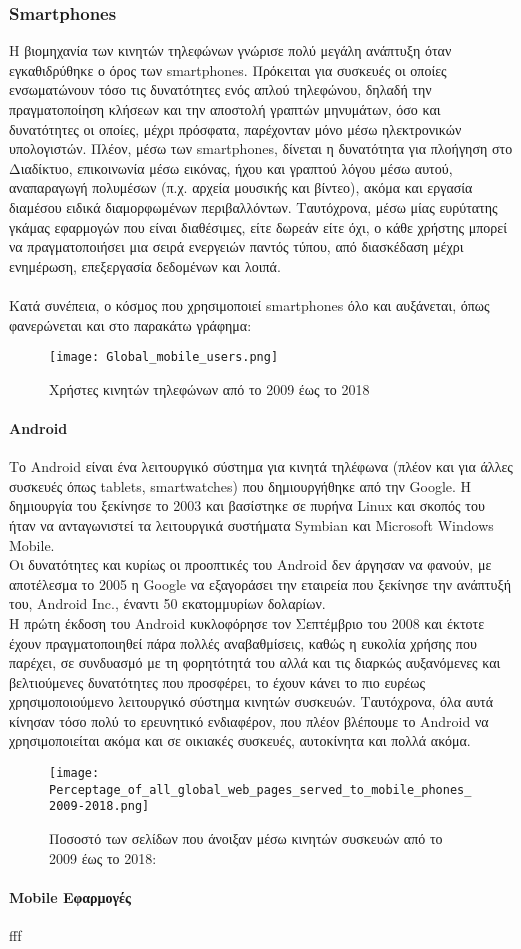 \documentclass{article}
\begin{document}
\subsubsection{Smartphones}
Η βιομηχανία των κινητών τηλεφώνων γνώρισε πολύ μεγάλη ανάπτυξη όταν εγκαθιδρύθηκε ο όρος των smartphones. Πρόκειται για συσκευές οι οποίες ενσωματώνουν τόσο τις δυνατότητες ενός απλού τηλεφώνου, δηλαδή την πραγματοποίηση κλήσεων και την αποστολή γραπτών μηνυμάτων, όσο και δυνατότητες οι οποίες, μέχρι πρόσφατα, παρέχονταν μόνο μέσω ηλεκτρονικών υπολογιστών. Πλέον, μέσω των smartphones, δίνεται η δυνατότητα για πλοήγηση στο Διαδίκτυο, επικοινωνία μέσω εικόνας, ήχου και γραπτού λόγου μέσω αυτού, αναπαραγωγή πολυμέσων (π.χ. αρχεία μουσικής και βίντεο), ακόμα και εργασία διαμέσου ειδικά διαμορφωμένων περιβαλλόντων. Ταυτόχρονα, μέσω μίας ευρύτατης γκάμας εφαρμογών που είναι διαθέσιμες, είτε δωρεάν είτε όχι, ο κάθε χρήστης μπορεί να πραγματοποιήσει μια σειρά ενεργειών παντός τύπου, από διασκέδαση μέχρι ενημέρωση, επεξεργασία δεδομένων και λοιπά.\\~\\
Κατά συνέπεια, ο κόσμος που χρησιμοποιεί smartphones όλο και αυξάνεται, όπως φανερώνεται και στο παρακάτω γράφημα:
\begin{figure}[h]
  \caption{Χρήστες κινητών τηλεφώνων από το 2009 έως το 2018}
  \centering
  \texttt{[image: Global\_mobile\_users.png]}
\end{figure}

\paragraph{Android}
Το Android είναι ένα λειτουργικό σύστημα για κινητά τηλέφωνα (πλέον και για άλλες συσκευές όπως tablets, smartwatches) που δημιουργήθηκε από την Google. Η δημιουργία του ξεκίνησε το 2003 και βασίστηκε σε πυρήνα Linux και σκοπός του ήταν να ανταγωνιστεί τα λειτουργικά συστήματα Symbian και Microsoft Windows Mobile.\\
Οι δυνατότητες και κυρίως οι προοπτικές του Android δεν άργησαν να φανούν, με αποτέλεσμα το 2005 η Google να εξαγοράσει την εταιρεία που ξεκίνησε την ανάπτυξή του, Android Inc., έναντι 50 εκατομμυρίων δολαρίων. \\
Η πρώτη έκδοση του Android κυκλοφόρησε τον Σεπτέμβριο του 2008 και έκτοτε έχουν πραγματοποιηθεί πάρα πολλές αναβαθμίσεις, καθώς η ευκολία χρήσης που παρέχει, σε συνδυασμό με τη φορητότητά του αλλά και τις διαρκώς αυξανόμενες και βελτιούμενες δυνατότητες που προσφέρει, το έχουν κάνει το πιο ευρέως χρησιμοποιούμενο λειτουργικό σύστημα κινητών συσκευών. Ταυτόχρονα, όλα αυτά κίνησαν τόσο πολύ το ερευνητικό ενδιαφέρον, που πλέον βλέπουμε το Android να χρησιμοποιείται ακόμα και σε οικιακές συσκευές, αυτοκίνητα και πολλά ακόμα.\\
\begin{figure}[h]
  \caption{Ποσοστό των σελίδων που άνοιξαν μέσω κινητών συσκευών από το 2009 έως το 2018:}
  \centering
  \texttt{[image: Perceptage\_of\_all\_global\_web\_pages\_served\_to\_mobile\_phones\_2009-2018.png]}
\end{figure}
\paragraph{Mobile Εφαρμογές}
fff
\end{document}
